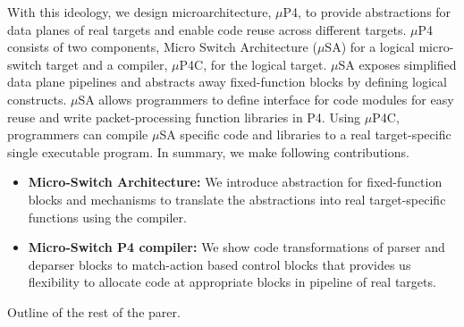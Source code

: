With this ideology, we design microarchitecture, $\mu$P4, to provide abstractions for 
data planes of real targets and enable code reuse across different targets.
$\mu$P4 consists of two components, Micro Switch Architecture ($\mu$SA) for a logical micro-switch target and a compiler, $\mu$P4C, for the logical target. 
$\mu$SA exposes simplified data plane pipelines and abstracts away fixed-function blocks by defining logical constructs.
$\mu$SA allows programmers to define interface for code modules for easy reuse and write packet-processing function libraries in P4.
Using $\mu$P4C, programmers can compile $\mu$SA specific code and libraries to a real target-specific single executable program.
In summary, we make following contributions.
\begin{itemize}
\item \textbf{Micro-Switch Architecture:} We introduce abstraction for fixed-function blocks and mechanisms to translate the abstractions into real target-specific functions using the compiler.
\item \textbf{Micro-Switch P4 compiler:} We show code transformations of parser and deparser blocks to match-action based control blocks that provides us flexibility to allocate code at appropriate blocks in pipeline of real targets.
\end{itemize}

Outline of the rest of the parer. 
